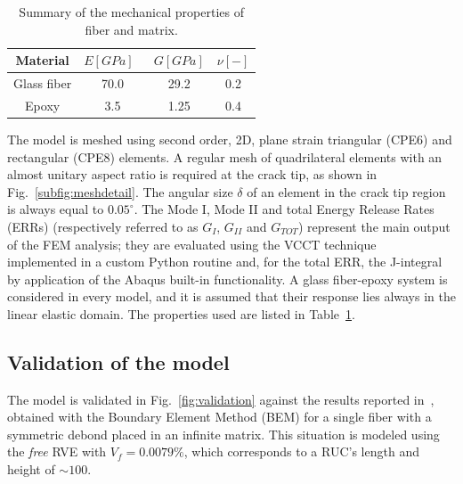 \documentclass[review]{elsarticle}
\begin{document}
\begin{table}[!htbp]
 \centering
 \caption{Summary of the mechanical properties of fiber and matrix.}
 \begin{tabular}{cccc}
\textbf{Material} & \textbf{$E\left[GPa\right]$}\ & \textbf{$G\left[GPa\right]$} & \textbf{$\nu\left[-\right]$} \\
\midrule
Glass fiber    & 70.0  & 29.2   & 0.2  \\
Epoxy    & 3.5    & 1.25   & 0.4
\end{tabular}
\label{tab:phaseprop}
\end{table}

The model is meshed using second order, 2D, plane strain triangular (CPE6) and rectangular (CPE8) elements. A regular mesh of quadrilateral elements with an almost unitary aspect ratio is required at the crack tip, as shown in Fig.~\ref{subfig:meshdetail}. The angular size $\delta$ of an element in the crack tip region is always equal to $0.05^{\circ}$. The Mode I, Mode II and total Energy Release Rates (ERRs) (respectively referred to as $G_{I}$, $G_{II}$ and $G_{TOT}$) represent the main output of the FEM analysis; they are evaluated using the VCCT technique~\cite{Krueger2004} implemented in a custom Python routine and, for the total ERR, the J-integral~\cite{Rice1968} by application of the Abaqus built-in functionality. A glass fiber-epoxy system is considered in every model, and it is assumed that their response lies always in the linear elastic domain. The properties used are listed in Table~\ref{tab:phaseprop}.

\subsection{Validation of the model}

The model is validated in Fig.~\ref{fig:validation} against the results reported in~\cite{Sandino2016}, obtained with the Boundary Element Method (BEM) for a single fiber with a symmetric debond placed in an infinite matrix. This situation is modeled using the \textit{free} RVE with $V_{f}=0.0079\%$, which corresponds to a RUC's length and height of $\sim 100$.
\end{document}
